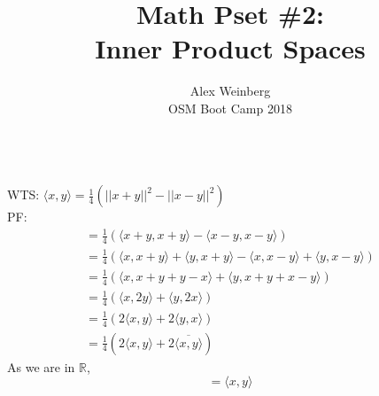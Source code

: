 \documentclass[letterpaper,12pt]{article}
\theoremstyle{definition}
\newenvironment{problem}[2][Problem]{\begin{trivlist}
\item[\hskip \labelsep {\bfseries #1}\hskip \labelsep {\bfseries #2.}]}{\end{trivlist}}
\newcommand\inner[2]{\langle #1, #2 \rangle}
\begin{document}
\title{Math Pset \#2:\\
Inner Product Spaces}
\author{Alex Weinberg\\
OSM Boot Camp 2018} %

\maketitle


\begin{problem}1 ~\\
WTS: $\inner{x}{y} = \frac{1}{4}(||x+y||^2 - ||x-y||^2)$ \\
PF:
\begin{gather*}
= \frac{1}{4}(\inner{x+y}{x+y} - \inner{x-y}{x-y}) \\
= \frac{1}{4}(\inner{x}{x+y} + \inner{y}{x+y} -  \inner{x}{x-y} +  \inner{y}{x-y}) \\
= \frac{1}{4}(\inner{x}{x+y+y-x} + \inner{y}{x+y+x-y}) \\
= \frac{1}{4}(\inner{x}{2y} + \inner{y}{2x}) \\
= \frac{1}{4}(2\inner{x}{y} + 2\inner{y}{x}) \\
= \frac{1}{4}(2\inner{x}{y} + 2\overline{\inner{x}{y}})
\end{gather*}
As we are in $\mathbb{R}$, $$= \inner{x}{y}$$
\end{problem}

\vspace{5mm}



\end{document}
